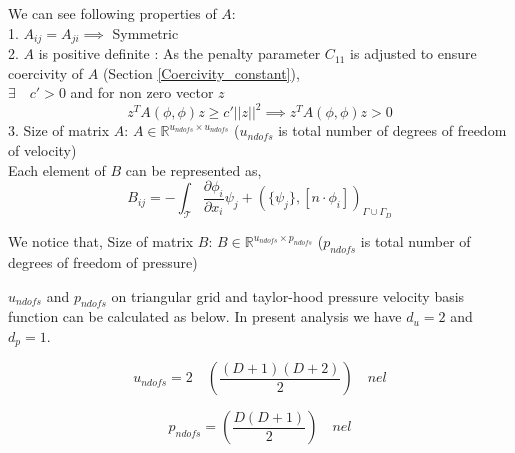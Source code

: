 \documentclass[a4paper,12pt]{book}
\begin{document}
We can see following properties of $A$: 
\\
1. $A_{ij} = A_{ji} \implies$ Symmetric\\
2. $A$ is positive definite : As the penalty parameter $C_{11}$ is adjusted to ensure coercivity of $A$ (Section \ref{Coercivity_constant}),\\
$\exists \quad c' > 0 $ and for non zero vector $z$
\begin{equation}
z^T A( \phi , \phi ) z \geq c' || z ||^2 \implies z^T A( \phi , \phi ) z > 0
\end{equation}
3. Size of matrix $A$: $A \in \mathbb{R}^{u_{ndofs} \times u_{ndofs}}$ ($u_{ndofs}$ is total number of degrees of freedom of velocity)\\

Each element of $B$ can be represented as,\\
\begin{equation} \label{matrix B}
B_{ij} = - \int_\mathcal{T} \frac{\partial \phi_i}{\partial x_i} \psi_j + (\lbrace \psi_j \rbrace , [n \cdot \phi_i])_{\Gamma \cup \Gamma_D}
\end{equation}

We notice that, Size of matrix $B$: $B \in \mathbb{R}^{u_{ndofs} \times p_{ndofs}}$ ($p_{ndofs}$ is total number of degrees of freedom of pressure)

$u_{ndofs}$ and $p_{ndofs}$ on triangular grid and taylor-hood pressure velocity basis function can be calculated as below. In present analysis we have $d_u = 2$ and $d_p = 1$.

\begin{equation} \label{undofs}
u_{ndofs} = 2 \quad \left( \frac{(D+1)(D+2)}{2} \right) \quad nel
\end{equation}

\begin{equation} \label{pndofs}
p_{ndofs} = \left(\frac{D(D+1)}{2}\right) \quad nel
\end{equation}
\end{document}
